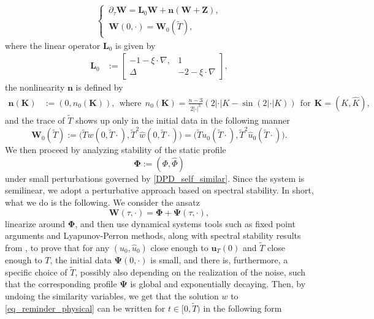 \documentclass[12pt,reqno]{amsart}
\theoremstyle{plain}
\theoremstyle{remark}
\theoremstyle{plain}
\theoremstyle{definition}
\numberwithin{equation}{section}
\numberwithin{equation}{section}
\begin{document}
	\begin{align}\label{DPD_self_similar}
		\begin{cases}
			\, \partial_\tau \mathbf{W}=\mathbf{L}_0 \mathbf{W}+\mathbf{n}(\mathbf{W}+\mathbf{Z}),\\
			\, \mathbf{W}(0,\cdot)=\mathbf{W}_0(\tilde{T}),
		\end{cases}    
	\end{align}
	where the linear operator $\mathbf{L}_0$ is given by
	\begin{align}\label{linear_operator_SS}
		\mathbf{L}_0&:=\begin{bmatrix}
			-1-\xi \cdot\nabla ,& 1\\ \Delta& -2-\xi\cdot\nabla
		\end{bmatrix},
	\end{align}
	the nonlinearity $\mathbf{n}$ is defined by        
	\begin{align} 
		\mathbf{n}(\mathbf{K})&:=(0,n_0(\mathbf{K})),\;\, \text{where} \;\,
		n_0(\mathbf{K})=\frac{n-3}{2 | \cdot |^3}\left(2| \cdot | K-\sin(2| \cdot | K)\right) \;\, \text{for} \;\, \mathbf{K}=(K,\hat{K}) \label{nonlinear_operator_physical},
	\end{align}
	and the trace of $\tilde{T}$ shows up only in the initial data in the following manner
	\begin{equation*}
		\mathbf{W}_0(\tilde{T}):=\big(  {\tilde{T}} w(0,{\tilde{T}}\cdot),{\tilde{T}^2}\hat{w}(0,{\tilde{T}}\cdot)  \big)=\big(  {\tilde{T}} u_0({\tilde{T}}\cdot),{\tilde{T}^2}\hat{u}_0({\tilde{T}}\cdot)  \big).
	\end{equation*}
	We then proceed by analyzing stability of the static profile
	\begin{equation*}
		\mathbf{\Phi}:=(\Phi,\hat{\Phi})
	\end{equation*}
	under small perturbations governed by \eqref{DPD_self_similar}.  Since the system is semilinear, we adopt a perturbative approach based on spectral stability. In short, what we do is the following. We consider the ansatz
	\begin{equation*}
	    \mathbf{W}(\tau,\cdot)=\mathbf{\Phi}+\mathbf{\Psi}(\tau,\cdot),
	\end{equation*}
	linearize around $\mathbf{\Phi}$, and then use dynamical systems tools such as fixed point arguments and Lyapunov-Perron methods, along with spectral stability results from \cite{glogic2025globally}, to prove that for any $(u_0,\hat{u}_0)$ close enough to $\mathbf{{u}}_{T}(0)$ and $\tilde{T}$ close enough to $T$, the initial data $\mathbf{\Psi}(0,\cdot)$ is small, and there is, furthermore, a specific choice of $\tilde{T}$, possibly also depending on the realization of the noise, such that the corresponding profile $\mathbf{\Psi}$ is global and exponentially decaying. Then, by undoing the similarity variables, we get that  the solution $w$ to \eqref{eq_reminder_physical} can be written for $t \in [0,\tilde{T})$ in the following form
\end{document}
